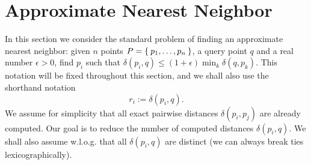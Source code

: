 \documentclass[a4paper,USenglish]{socg-lipics-v2018}
\newcommand{\eps}{\epsilon}
\newcommand{\dist}{\delta}
\begin{document}


\section{Approximate Nearest Neighbor}

In this section we consider the standard problem of finding an approximate nearest neighbor: given
$n$ points $P = \Set{p_1, \dots, p_n}$, a query point $q$ and a real number $\eps > 0$,
find $p_i$ such that $\dist(p_i, q) \leq (1 + \eps) \min_{k} \dist(q, p_k)$. This notation will be fixed throughout this 
section, and we shall also use the shorthand notation
\[
    r_i := \dist(p_i, q).
\]
We assume for simplicity
that all exact pairwise distances $\dist(p_i, p_j)$ are already computed.
Our goal is to reduce the number of computed distances $\dist(p_i, q)$. We shall also assume w.l.o.g.
that all $\dist(p_i, q)$ are distinct (we can always break ties lexicographically).
\end{document}
